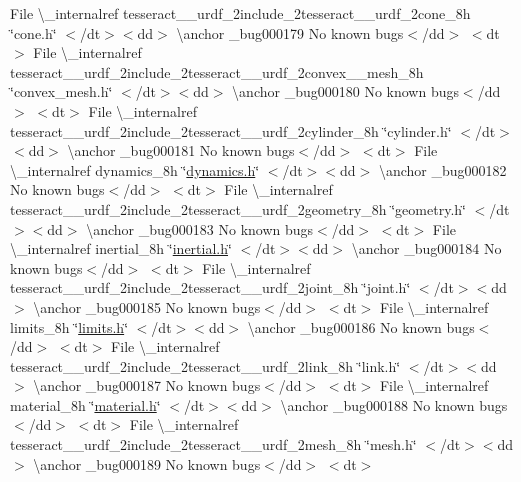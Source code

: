 \begin{DoxyRefList}
\+File \textbackslash{}\+\_\+internalref tesseract\+\_\+\+\_\+urdf\+\_\+2include\+\_\+2tesseract\+\_\+\+\_\+urdf\+\_\+2cone\+\_\+8h \char`\"{}cone.\+h\char`\"{} $<$/dt$>$$<$dd$>$ \textbackslash{}anchor \+\_\+bug000179 No known bugs$<$/dd$>$ $<$dt$>$
\+File \textbackslash{}\+\_\+internalref tesseract\+\_\+\+\_\+urdf\+\_\+2include\+\_\+2tesseract\+\_\+\+\_\+urdf\+\_\+2convex\+\_\+\+\_\+mesh\+\_\+8h \char`\"{}convex\+\_\+mesh.\+h\char`\"{} $<$/dt$>$$<$dd$>$ \textbackslash{}anchor \+\_\+bug000180 No known bugs$<$/dd$>$ $<$dt$>$
\+File \textbackslash{}\+\_\+internalref tesseract\+\_\+\+\_\+urdf\+\_\+2include\+\_\+2tesseract\+\_\+\+\_\+urdf\+\_\+2cylinder\+\_\+8h \char`\"{}cylinder.\+h\char`\"{} $<$/dt$>$$<$dd$>$ \textbackslash{}anchor \+\_\+bug000181 No known bugs$<$/dd$>$ $<$dt$>$
\+File \textbackslash{}\+\_\+internalref dynamics\+\_\+8h \char`\"{}\mbox{\hyperlink{dynamics_8h}{dynamics.\+h}}\char`\"{} $<$/dt$>$$<$dd$>$ \textbackslash{}anchor \+\_\+bug000182 No known bugs$<$/dd$>$ $<$dt$>$
\+File \textbackslash{}\+\_\+internalref tesseract\+\_\+\+\_\+urdf\+\_\+2include\+\_\+2tesseract\+\_\+\+\_\+urdf\+\_\+2geometry\+\_\+8h \char`\"{}geometry.\+h\char`\"{} $<$/dt$>$$<$dd$>$ \textbackslash{}anchor \+\_\+bug000183 No known bugs$<$/dd$>$ $<$dt$>$
\+File \textbackslash{}\+\_\+internalref inertial\+\_\+8h \char`\"{}\mbox{\hyperlink{inertial_8h}{inertial.\+h}}\char`\"{} $<$/dt$>$$<$dd$>$ \textbackslash{}anchor \+\_\+bug000184 No known bugs$<$/dd$>$ $<$dt$>$
\+File \textbackslash{}\+\_\+internalref tesseract\+\_\+\+\_\+urdf\+\_\+2include\+\_\+2tesseract\+\_\+\+\_\+urdf\+\_\+2joint\+\_\+8h \char`\"{}joint.\+h\char`\"{} $<$/dt$>$$<$dd$>$ \textbackslash{}anchor \+\_\+bug000185 No known bugs$<$/dd$>$ $<$dt$>$
\+File \textbackslash{}\+\_\+internalref limits\+\_\+8h \char`\"{}\mbox{\hyperlink{limits_8h}{limits.\+h}}\char`\"{} $<$/dt$>$$<$dd$>$ \textbackslash{}anchor \+\_\+bug000186 No known bugs$<$/dd$>$ $<$dt$>$
\+File \textbackslash{}\+\_\+internalref tesseract\+\_\+\+\_\+urdf\+\_\+2include\+\_\+2tesseract\+\_\+\+\_\+urdf\+\_\+2link\+\_\+8h \char`\"{}link.\+h\char`\"{} $<$/dt$>$$<$dd$>$ \textbackslash{}anchor \+\_\+bug000187 No known bugs$<$/dd$>$ $<$dt$>$
\+File \textbackslash{}\+\_\+internalref material\+\_\+8h \char`\"{}\mbox{\hyperlink{material_8h}{material.\+h}}\char`\"{} $<$/dt$>$$<$dd$>$ \textbackslash{}anchor \+\_\+bug000188 No known bugs$<$/dd$>$ $<$dt$>$
\+File \textbackslash{}\+\_\+internalref tesseract\+\_\+\+\_\+urdf\+\_\+2include\+\_\+2tesseract\+\_\+\+\_\+urdf\+\_\+2mesh\+\_\+8h \char`\"{}mesh.\+h\char`\"{} $<$/dt$>$$<$dd$>$ \textbackslash{}anchor \+\_\+bug000189 No known bugs$<$/dd$>$ $<$dt$>$
$$
\end{DoxyRefList}
